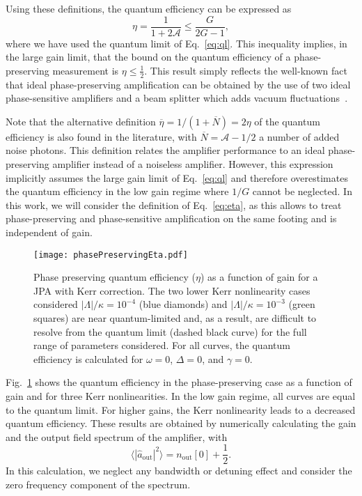 \documentclass[pra,twocolumn,superscriptaddress]{revtex4-1}
\newcommand{\aout}[0]{\hat{a}_{\mathrm{out}}}
\newcommand{\Am}[0]{\mathcal{A}}
\begin{document}
Using these definitions, the quantum efficiency can be expressed as
\begin{equation}
	\eta = \frac{1}{1+ 2\Am} \leq \frac{G}{2G-1},
	\label{eq:eta}
\end{equation}
% 
where we have used the quantum limit of Eq.~\eqref{eq:ql}.
This inequality implies, in the large gain limit, that the bound on the quantum efficiency of a phase-preserving measurement is $\eta \leq \frac{1}{2}$. This result simply reflects the well-known fact that ideal phase-preserving amplification can be obtained by the use of two ideal phase-sensitive amplifiers and a beam splitter which adds vacuum fluctuations~\cite{caves:1982a}.

Note that the alternative definition $\overline{\eta} =  1/(1+ \overline{N}) =2\eta$ of the quantum efficiency is also found in the literature, with $\overline{N} = \Am -1/2$ a number of added noise photons. 
% 
This definition relates the amplifier performance to an ideal phase-preserving amplifier instead of a noiseless amplifier. However, this expression implicitly assumes the large gain limit of Eq.~\eqref{eq:ql} and therefore overestimates the quantum efficiency in the low gain regime where $1/G$ cannot be neglected.
% 
 In this work, we will consider the definition of Eq.~\eqref{eq:eta}, as this allows to treat phase-preserving and phase-sensitive amplification on the same footing and is independent of gain.

\begin{figure}[tb]
	\texttt{[image: phasePreservingEta.pdf]}
	\caption{
	Phase preserving quantum efficiency ($\eta$) as a function of gain for a JPA with Kerr correction.
	The two lower Kerr nonlinearity cases considered $|\Lambda|/\kappa= 10^{-4}$ (blue diamonds) and $|\Lambda|/\kappa= 10^{-3}$ (green squares) are near quantum-limited and, as a result, are difficult to resolve from the quantum limit (dashed black curve) for the full range of parameters considered.
	For all curves, the quantum efficiency is calculated for $\omega=0$, $\Delta=0$, and $\gamma=0$.}
	\label{fig:phasePreservingEta}
\end{figure}
% 
Fig.~\ref{fig:phasePreservingEta} shows the quantum efficiency in the phase-preserving case as a function of gain and for three Kerr nonlinearities. In the low gain regime, all curves are equal to the quantum limit. For higher gains, the Kerr nonlinearity leads to a decreased quantum efficiency. These results are obtained by numerically calculating the gain and the output field spectrum of the amplifier, with
\begin{equation}
	 \langle | \aout| ^2 \rangle  = n_{\mathrm{out}}[0] +\frac{1}{2}.
\end{equation}
In this calculation, we neglect any bandwidth or detuning effect and consider the zero frequency component of the spectrum. 
\end{document}
